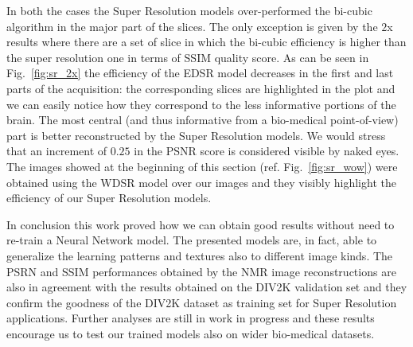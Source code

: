 \documentclass{standalone}
\begin{document}
In both the cases the Super Resolution models over-performed the bi-cubic algorithm in the major part of the slices.
The only exception is given by the $2$x results where there are a set of slice in which the bi-cubic efficiency is higher than the super resolution one in terms of SSIM quality score.
As can be seen in Fig.~\ref{fig:sr_2x} the efficiency of the EDSR model decreases in the first and last parts of the acquisition: the corresponding slices are highlighted in the plot and we can easily notice how they correspond to the less informative portions of the brain.
The most central (and thus informative from a bio-medical point-of-view) part is better reconstructed by the Super Resolution models.
We would stress that an increment of $0.25$ in the PSNR score is considered visible by naked eyes.
The images showed at the beginning of this section (ref. Fig.~\ref{fig:sr_wow}) were obtained using the WDSR model over our images and they visibly highlight the efficiency of our Super Resolution models.

In conclusion this work proved how we can obtain good results without need to re-train a Neural Network model.
The presented models are, in fact, able to generalize the learning patterns and textures also to different image kinds.
The PSRN and SSIM performances obtained by the NMR image reconstructions are also in agreement with the results obtained on the DIV2K validation set and they confirm the goodness of the DIV2K dataset as training set for Super Resolution applications.
Further analyses are still in work in progress and these results encourage us to test our trained models also on wider bio-medical datasets.
\end{document}
